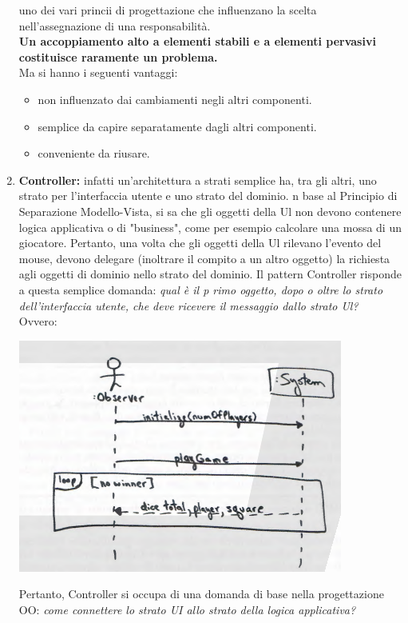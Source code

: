 \documentclass[a4paper,12pt, oneside]{book}
\begin{document}
\begin{enumerate}
uno dei vari princii di progettazione che influenzano la scelta nell'assegnazione di una
responsabilità.\\
\textbf{Un accoppiamento alto a elementi stabili e a elementi pervasivi costituisce raramente un
  problema.}\\
Ma si hanno i seguenti vantaggi:
\begin{itemize}
\item non influenzato dai cambiamenti negli altri componenti.
\item semplice da capire separatamente dagli altri componenti.
\item conveniente da riusare.
\end{itemize}
\item \textbf{Controller:} infatti un'architettura a strati semplice ha, tra gli altri, uno strato per l'interfaccia utente e
uno strato del dominio. n base al Principio di Separazione Modello-Vista, si sa che gli oggetti della Ul non devono contenere logica applicativa o di "business", come per esempio calcolare una mossa
di un giocatore. Pertanto, una volta che gli oggetti della Ul rilevano l'evento del mouse,
devono delegare (inoltrare il compito a un altro oggetto) la richiesta agli oggetti di dominio nello strato del dominio.
Il pattern Controller risponde a questa semplice domanda: \textit{qual è il p rimo oggetto, dopo
  o oltre lo strato dell'interfaccia utente, che deve ricevere il messaggio dallo strato Ul?}\\
Ovvero:
\begin{center}
\includegraphics[scale = 0.7]{img/grasp10.png}
\end{center}
Pertanto, Controller si occupa di una domanda di base nella progettazione OO:\textit{ come
  connettere lo strato UI allo strato della logica applicativa?}\\

\end{enumerate}
\end{document}
